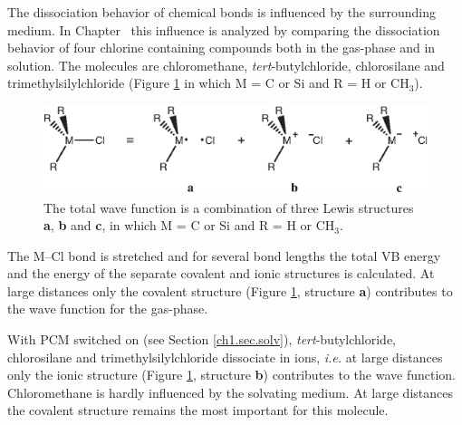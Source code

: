 The dissociation behavior of chemical bonds is influenced by the surrounding medium. In Chapter \chdissociation\ this influence is analyzed by comparing the dissociation behavior of four chlorine containing compounds both in the gas-phase and in solution. The molecules are chloromethane, \textit{tert}-butylchloride, chlorosilane and trimethylsilylchloride (Figure \ref{ch1.fig.structures1} in which M = C or Si and R = H or CH$_3$).
\begin{figure}[htbp]
\center
\includegraphics{introduction/figures/structures.eps}
\caption{The total wave function is a combination of three Lewis structures \textbf{a}, \textbf{b} and \textbf{c}, in which M = C or Si and R = H or CH$_3$.}
\label{ch1.fig.structures1}
\end{figure}
The M--Cl bond  is stretched and for several bond lengths the total VB energy and the energy of the separate covalent and ionic structures is calculated. At large distances only the covalent structure (Figure \ref{ch1.fig.structures1}, structure \textbf{a}) contributes to the wave function for the gas-phase.

With PCM switched on (see Section \ref{ch1.sec.solv}), \textit{tert}-butylchloride, chlorosilane and trimethylsilylchloride dissociate in ions, \textit{i.e.} at large distances only the ionic structure (Figure \ref{ch1.fig.structures1}, structure \textbf{b}) contributes to the wave function.  Chloromethane is hardly influenced by the solvating medium. At large distances the covalent structure remains the most important for this molecule.  

